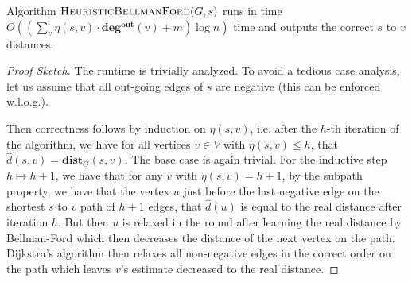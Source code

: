 \begin{theorem}
Algorithm $\textsc{HeuristicBellmanFord}(G,s)$ runs in time $O((\sum_v \eta(s,v) \cdot \mathbf{deg^{out}}(v) + m) \log n)$ time and outputs the correct $s$ to $v$ distances.
\end{theorem}
\begin{proof}[Proof Sketch]
The runtime is trivially analyzed. To avoid a tedious case analysis, let us assume that all out-going edges of $s$ are negative (this can be enforced w.l.o.g.). 

Then correctness follows by induction on $\eta(s,v)$, i.e. after the $h$-th iteration of the algorithm, we have for all vertices $v \in V$ with $\eta(s,v) \leq h$, that $\hat{d}(s,v) = \mathbf{dist}_G(s,v)$. The base case is again trivial. For the inductive step $h \mapsto h+1$, we have that for any $v$ with $\eta(s,v) = h+1$, by the subpath property, we have that the vertex $u$ just before the last negative edge on the shortest $s$ to $v$ path of $h+1$ edges, that $\hat{d}(u)$ is equal to the real distance after iteration $h$. But then $u$ is relaxed in the round after learning the real distance by Bellman-Ford which then decreases the distance of the next vertex on the path. Dijkstra's algorithm then relaxes all non-negative edges in the correct order on the path which leaves $v$'s estimate decreased to the real distance. 
\end{proof}



